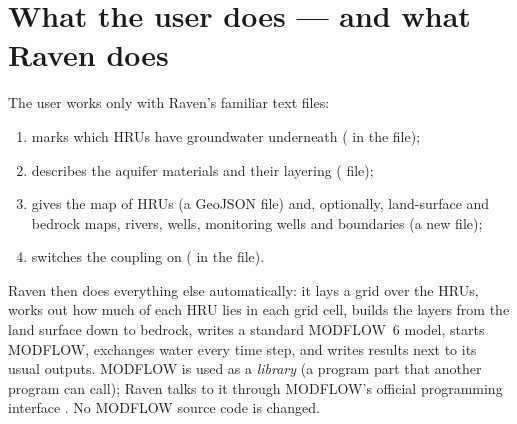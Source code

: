 \section{What the user does --- and what Raven does}
The user works only with Raven's familiar text files:
\begin{enumerate}
\item marks which HRUs have groundwater underneath ( in the  file);
\item describes the aquifer materials and their layering ( file);
\item gives the map of HRUs (a GeoJSON file) and, optionally, land-surface and bedrock maps, rivers, wells,
monitoring wells and boundaries (a new  file);
\item switches the coupling on ( in the  file).
\end{enumerate}
Raven then does everything else automatically: it lays a grid over the HRUs, works out how much of each HRU lies in
each grid cell, builds the layers from the land surface down to bedrock, writes a standard MODFLOW~6 model, starts
MODFLOW, exchanges water every time step, and writes results next to its usual outputs. MODFLOW is used as a
\emph{library} (a program part that another program can call); Raven talks to it through MODFLOW's official
programming interface \cite{hughes2022xmi}. No MODFLOW source code is changed.

